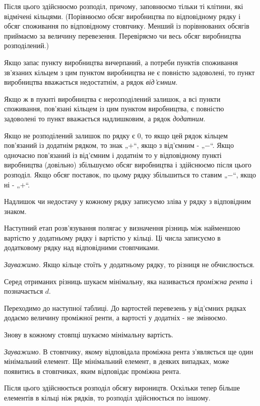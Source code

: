 \documentclass[12pt,a4paper]{report}
\begin{document}
Після цього здійснюємо розподіл, причому, заповнюємо тільки ті клітини, які відмічені кільцями. (Порівнюємо обсяг виробництва по відповідному рядку і обсяг споживання по відповідному стовпчику. Менший із порівнюваних обсягів приймаємо за величину перевезення. Перевіряємо чи весь обсяг виробництва розподілений.)

Якщо запас пункту виробництва вичерпаний, а потреби пунктів споживання зв’язаних кільцем з цим пунктом виробництва не є повністю задоволені, то пункт виробництва вважається недостатнім, а рядок \emph{від’ємним}.

Якщо ж в пукнті виробництва є нерозподілений залишок, а всі пункти споживання, пов’язані кільцем із цим пунктом виробництва, є повністю задоволені то пункт вважається надлишковим, а рядок \emph{додатним}.

Якщо не розподілений залишок по рядку є 0, то якщо цей рядок кільцем пов’язаний із додатнім рядком, то знак „$+$“, якщо з від’ємним - „$-$“. Якщо одночасно пов’язаний із від’ємним і додатнім то у відповідному пункті виробництва (довільно) збільшуємо обсяг виробництва і здійснюємо після цього розподіл. Якщо обсяг поставок, по цьому рядку збільшиться то ставим „$-$“, якщо ні - „$+$“.

Надлишок чи недостачу у кожному рядку записуємо зліва у рядку з відповідним знаком.

Наступний етап розв’язування полягає у визначення різниць між найменшою вартістю у додатньому рядку і вартістю у кільці. Ці числа записуємо в додатковому рядку над відповідними стовпчиками.

\emph{Зауважимо.} Якщо кільце стоїть у додатньому рядку, то різниця не обчислюється.

Серед отриманих різниць шукаєм мінімальну, яка називається \emph{проміжна рента} і позначається $d$.

Переходимо до наступної таблиці. До вартостей перевезень у від’ємних рядках додаємо величину проміжної ренти, а вартості у додатніх - не змінюємо.

Знову в кожному стовпці шукаємо мінімальну вартість.

\emph{Зауважимо.} В стовпчику, якому відповідала проміжна рента з’являється ще один мінімальний елемент. Ще мінімальний елемент, в деяких випадках, може появитись в стовпчиках, яким відповідає проміжна рента.

Після цього здійснюється розподіл обсягу вироництв. Оскільки тепер більше елементів в кільці ніж рядків, то розподіл здійснюється по іншому.
\end{document}
